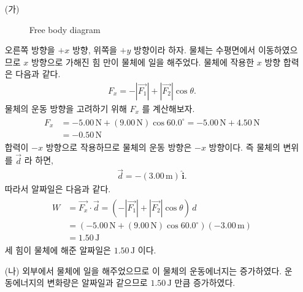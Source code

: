 \documentclass[floatfix,nofootinbib,superscriptaddress,fleqn,preprint]{revtex4}
\begin{document}
\begin{itemize}
  \item [(가)] 
  \begin{figure}
     \caption{Free body diagram}
  \end{figure}
 오른쪽 방향을 $+x$ 방향, 위쪽을 $+y$ 방향이라 하자. 
 물체는 수평면에서 이동하였으므로 $x$ 방향으로 가해진 힘 만이 물체에 일을 해주었다. 
 물체에 작용한 $x$ 방향 합력은 다음과 같다.
 \begin{align}
   F_x = -|\vec{F_1}|+|\vec{F_2}|\cos{\theta}.
 \end{align}
 물체의 운동 방향을 고려하기 위해 $F_x$ 를 계산해보자.
 \begin{align}
  \begin{split}
    F_x &= -5.00\,\mathrm{N}+(9.00\,\mathrm{N})\cos{60.0^\circ}
    = -5.00\,\mathrm{N}+4.50\,\mathrm{N} \\
    &= -0.50\,\mathrm{N}
  \end{split}
 \end{align}
 합력이 $-x$ 방향으로 작용하므로 물체의 운동 방향은 $-x$ 방향이다. 즉 
 물체의 변위를 $\vec{d}$ 라 하면,
 \begin{align}\label{eq:3-1}
   \vec{d} = -(3.00\,\mathrm{m})\,\hat{\bm{i}}.
 \end{align} 
 따라서 알짜일은 다음과 같다.
 \begin{align}
  \begin{split}
    W &= \vec{F_x}\cdot\vec{d}= \left(-|\vec{F_1}|+|\vec{F_2}|\cos{\theta}\right)\,d \\
    &= \left(-5.00\,\mathrm{N}+(9.00\,\mathrm{N})\cos{60.0^\circ}\right)
    (-3.00\,\mathrm{m})  \\
    &= 1.50\,\mathrm{J}
  \end{split}
 \end{align}
 세 힘이 물체에 해준 알짜일은 $1.50\,\mathrm{J}$ 이다.
  \item [(나)] 외부에서 물체에 일을 해주었으므로 이 물체의 운동에너지는 
  증가하였다. 운동에너지의 변화량은 알짜일과 같으므로 $1.50\,\mathrm{J}$ 
  만큼 증가하였다.
\end{itemize}
\end{document}
